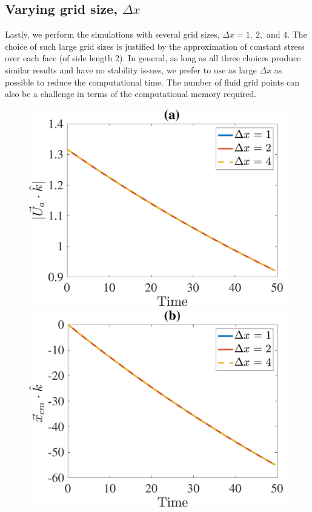 \subsection{Varying grid size, $\Delta x$}
Lastly, we perform the simulations with several grid sizes, $\Delta x = 1, \ 2, $ and $4$. 
The choice of such large grid sizes is justified by the approximation of constant stress over each face (of side length 2).
In general, as long as all three choices produce similar results and have no stability issues, we prefer to use as large $\Delta x$ as possible to reduce the computational time. 
The number of fluid grid points can also be a challenge in terms of the computational memory required. 
\par
\begin{figure}[ht]
	\begin{center}
		\includegraphics[scale=0.35]{./figures/fig_NC10_dx_Ua3_all}
		\includegraphics[scale=0.35]{./figures/fig_NC10_dx_cm3_all}

\end{center}
\end{figure}
